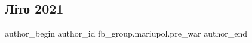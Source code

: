  
 
 
 
 

\subsection{Літо 2021}
\label{sec:14_02_2023.fb.fb_group.mariupol.pre_war.5.l_to_2021}

\ifcmt
 author_begin
   author_id fb_group.mariupol.pre_war
 author_end
\fi
